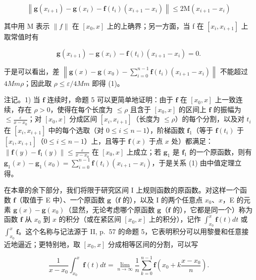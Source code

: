 \[
\left\| \mathbf {g} \left(x _ {i + 1}\right) - \mathbf {g} \left(x _ {i}\right) - \mathbf {f} \left(t _ {i}\right) \left(x _ {i + 1} - x _ {i}\right) \right\| \leqslant 2 \mathrm{M} \left(x _ {i + 1} - x _ {i}\right)
\]

其中用 M 表示 \(\|f\|\) 在 \([x_{0}, x]\) 上的上确界；另一方面，当 f 在 \([x_{i}, x_{i+1}]\) 上取常值时有

\[
\mathbf {g} (x _ {i + 1}) - \mathbf {g} (x _ {i}) - \mathbf {f} (t _ {i}) (x _ {i + 1} - x _ {i}) = 0.
\]

于是可以看出，差 \(\left\|\mathbf{g}(x)-\mathbf{g}(x_{0})-\sum_{i=0}^{n-1}\mathbf{f}(t_{i})(x_{i+1}-x_{i})\right\|\) 不能超过 \(4Mm\rho\)；因此取 \(\rho\leqslant\varepsilon/4Mm\) 即得 (1)。

注记。1) 当 \(\mathbf{f}\) 连续时，命题 5 可以更简单地证明：由于 \(\mathbf{f}\) 在 \([x_0, x]\) 上一致连续，存在 \(\rho > 0\)，使得在每个长度为 \(\leqslant \rho\) 且含于 \([x_0, x]\) 的区间上 \(\mathbf{f}\) 的振幅为 \(\leqslant \frac{\varepsilon}{x - x_0}\)；对 \([x_0, x]\) 分成区间 \([x_i, x_{i+1}]\)（长度为 \(\leqslant \rho\)）的每个分割，以及对 \(t_i\) 在 \([x_i, x_{i+1}]\) 中的每个选取（对 \(0 \leqslant i \leqslant n-1\)），阶梯函数 \(\mathbf{f}_1\)（等于 \(\mathbf{f}(t_i)\) 于 \([x_i, x_{i+1}]\)（\(0 \leqslant i \leqslant n-1\)）上，且等于 \(\mathbf{f}(x)\) 于点 \(x\) 处）都满足：\(\| \mathbf{f}(y) - \mathbf{f}_1(y)\| \leqslant \frac{\varepsilon}{x - x_0}\) 在 \([x_0, x]\) 上成立；若 \(\mathbf{g}_1\) 是 \(\mathbf{f}_1\) 的一个原函数，则有 \(\mathbf{g}_1(x) - \mathbf{g}_1(x_0) = \sum_{i=0}^{n-1} \mathbf{f}(t_i)(x_{i+1} - x_i)\)，于是关系 (1) 由中值定理立得。

在本章的余下部分，我们将限于研究区间 I 上规则函数的原函数。对这样一个函数 \(\mathbf{f}\)（取值于 E 中）、一个原函数 \(\mathbf{g}\)（\(\mathbf{f}\) 的），以及 I 的两个任意点 \(x_0\)、\(x\)，E 的元素 \(\mathbf{g}(x) - \mathbf{g}(x_0)\)（显然，无论考虑哪个原函数 \(\mathbf{g}\)（\(\mathbf{f}\) 的），它都是同一个）称为函数 \(\mathbf{f}\) 从 \(x_0\) 到 \(x\) 的积分（或在紧区间 \([x_0, x]\) 上的积分），记作 \(\int_{x_0}^{x} \mathbf{f}(t) dt\) 或 \(\int_{x_0}^{x} \mathbf{f}\)。这个名称与记法源于 II, p.~57 的命题 5，它表明积分可以用黎曼和任意接近地逼近；更特别地，取 \([x_0, x]\) 分成相等区间的分割，可以写

\[
\frac {1}{x - x _ {0}} \int_ {x _ {0}} ^ {x} \mathbf {f} (t) d t = \lim _ {n \rightarrow \infty} \frac {1}{n} \sum_ {k = 0} ^ {n - 1} \mathbf {f} \left(x _ {0} + k \frac {x - x _ {0}}{n}\right).\tag{2}
\]

